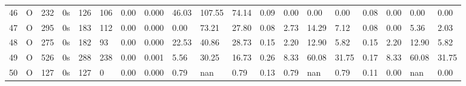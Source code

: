 \begin{tabular}{rllllllrlllllllllll}
46 & O & 232 & 0s & 126 & 106 & 0.00 & 0.000 & 46.03 & 107.55 & 74.14 & 0.09 & 0.00 & 0.00 & 0.00 & 0.08 & 0.00 & 0.00 & 0.00 \\
47 & O & 295 & 0s & 183 & 112 & 0.00 & 0.000 & 0.00 & 73.21 & 27.80 & 0.08 & 2.73 & 14.29 & 7.12 & 0.08 & 0.00 & 5.36 & 2.03 \\
48 & O & 275 & 0s & 182 & 93 & 0.00 & 0.000 & 22.53 & 40.86 & 28.73 & 0.15 & 2.20 & 12.90 & 5.82 & 0.15 & 2.20 & 12.90 & 5.82 \\
49 & O & 526 & 0s & 288 & 238 & 0.00 & 0.001 & 5.56 & 30.25 & 16.73 & 0.26 & 8.33 & 60.08 & 31.75 & 0.17 & 8.33 & 60.08 & 31.75 \\
50 & O & 127 & 0s & 127 & 0 & 0.00 & 0.000 & 0.79 & nan & 0.79 & 0.13 & 0.79 & nan & 0.79 & 0.11 & 0.00 & nan & 0.00 \\
\bottomrule
\end{tabular}
